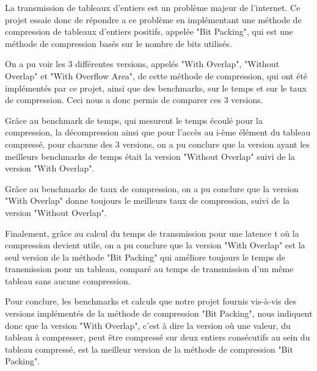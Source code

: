 \documentclass[titlepage]{article}
\begin{document}
La transmission de tableaux d’entiers est un problème majeur de l’internet. Ce projet essaie donc de répondre a ce problème en implémentant une méthode de compression de tableaux d'entiers positifs, appelée "Bit Packing", qui est une méthode de compression basés sur le nombre de bits utilisés.
\par On a pu voir les 3 différentes versions, appelés "With Overlap", "Without Overlap" et "With Overflow Area", de cette méthode de compression, qui ont été implémentés par ce projet, ainsi que des benchmarks, sur le temps et sur le taux de compression. Ceci nous a donc permis de comparer ces 3 versions.
\par Grâce au benchmark de temps, qui mesurent le temps écoulé pour la compression, la décompression ainsi que pour l'accès au i-ème élément du tableau compressé, pour chacune des 3 versions, on a pu conclure que la version ayant les meilleurs benchmarks de temps était la version "Without Overlap" suivi de la version "With Overlap".
\par Grâce au benchmarks de taux de compression, on a pu conclure que la version "With Overlap" donne toujours le meilleurs taux de compression, suivi de la version "Without Overlap".
\par Finalement, grâce au calcul du temps de transmission pour une latence t où la compression devient utile, on a pu conclure que la version "With Overlap" est la seul version de la méthode "Bit Packing" qui améliore toujours le temps de transmission pour un tableau, comparé au temps de transmission d'un même tableau sans aucune compression.
\par Pour conclure, les benchmarks et calculs que notre projet fournis vis-à-vis des versions implémentés de la méthode de compression "Bit Packing", nous indiquent donc que la version "With Overlap", c'est à dire la version où une valeur, du tableau à compresser, peut être compressé sur deux entiers consécutifs au sein du tableau compressé, est la meilleur version de la méthode de compression "Bit Packing".

\clearpage
\end{document}
